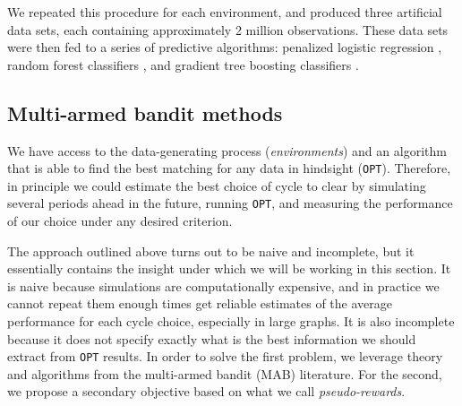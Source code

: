 \documentclass[format=acmsmall, review=false]{acmart}
\begin{document}
We repeated this procedure for each environment, and produced three artificial data sets, each containing approximately 2 million observations. These data sets were then fed to a series of predictive algorithms: penalized logistic regression \citep{wu2009genome}, random forest classifiers \citep{breiman2001random}, and gradient tree boosting classifiers \citep{friedman2001greedy}. 



\subsection{Multi-armed bandit methods}

We have access to the data-generating process (\emph{environments}) and an algorithm that is able to find the best matching for any data in hindsight (\texttt{OPT}). Therefore, in principle we could estimate the best choice of cycle to clear by simulating several periods ahead in the future, running \texttt{OPT}, and measuring the performance of our choice under any desired criterion. 

The approach outlined above turns out to be naive and incomplete, but it essentially contains the insight under which we will be working in this section. It is naive because simulations are computationally expensive, and in practice we cannot repeat them enough times get reliable estimates of the average performance for each cycle choice, especially in large graphs. It is also incomplete because it does not specify exactly what is the best information we should extract from \texttt{OPT} results. In order to solve the first problem, we leverage theory and algorithms from the multi-armed bandit (MAB) literature. For the second, we propose a secondary objective based on what we call \emph{pseudo-rewards}.
\end{document}

